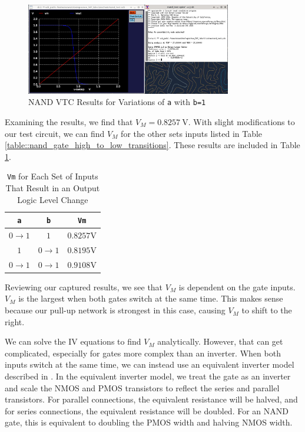 \documentclass[fleqn]{article}
\begin{document}
	\begin{figure}[H]
		\centerline{\includegraphics[width=0.8\textwidth]{nand_vtc_sweep_va.png}}
		\caption{NAND VTC Results for Variations of \texttt{a} with \texttt{b=1}}
		\label{fig::nand_vtc_sweep_va}
	\end{figure}
	
	Examining the results, we find that $V_M = 0.8257\ \text{V}$. With slight modifications to our test circuit, we can find $V_M$ for the other sets inputs listed in Table \ref{table::nand_gate_high_to_low_transitions}. These results are included in Table \ref{table::nand_gate_vm}.
	
	\begin{table}[H]
	\begin{center}
	\caption{\texttt{Vm} for Each Set of Inputs That Result in an Output Logic Level Change}
	\label{table::nand_gate_vm}
	\begin{tabular}{| c | c | c |}
		\hline
		\texttt{a} & \texttt{b} & \texttt{Vm}\\
		\hline	
		$0 \rightarrow 1$ & $1$ & $0.8257 \text{V}$\\
		\hline	
		$1$ & $0 \rightarrow 1$ & $0.8195 \text{V}$\\
		\hline	
		$0 \rightarrow 1$ & $0 \rightarrow 1$ & $0.9108 \text{V}$\\
		\hline
	\end{tabular}
	\end{center}
	\end{table}
	
	\noindent Reviewing our captured results, we see that $V_M$ is dependent on the gate inputs. $V_M$ is the largest when both gates switch at the same time. This makes sense because our pull-up network is strongest in this case, causing $V_M$ to shift to the right.
	
	We can solve the IV equations to find $V_M$ analytically. However, that can get complicated, especially for gates more complex than an inverter. When both inputs switch at the same time, we can instead use an equivalent inverter model described in \cite{cmos_vlsi_design, equivalent_inverter, inverter_dc_analysis}. In the equivalent inverter model, we treat the gate as an inverter and scale the NMOS and PMOS transistors to reflect the series and parallel transistors. For parallel connections, the equivalent resistance will be halved, and for series connections, the equivalent resistance will be doubled. For an NAND gate, this is equivalent to doubling the PMOS width and halving NMOS width.
	
\end{document}
